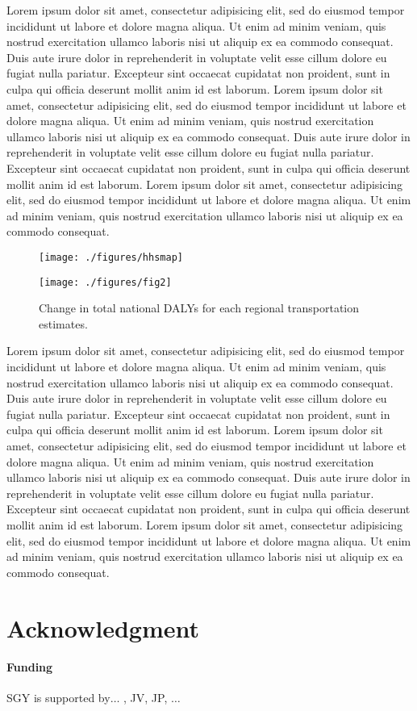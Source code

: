 \documentclass{bioinfo}
\begin{document}
Lorem ipsum dolor sit amet, consectetur adipisicing elit, sed do
eiusmod tempor incididunt ut labore et dolore magna aliqua. Ut enim ad
minim veniam, quis nostrud exercitation ullamco laboris nisi ut
aliquip ex ea commodo consequat. Duis aute irure dolor in
reprehenderit in voluptate velit esse cillum dolore eu fugiat nulla
pariatur. Excepteur sint occaecat cupidatat non proident, sunt in
culpa qui officia deserunt mollit anim id est laborum. Lorem ipsum
dolor sit amet, consectetur adipisicing elit, sed do eiusmod tempor
incididunt ut labore et dolore magna aliqua. Ut enim ad minim veniam,
quis nostrud exercitation ullamco laboris nisi ut aliquip ex ea
commodo consequat. Duis aute irure dolor in reprehenderit in voluptate
velit esse cillum dolore eu fugiat nulla pariatur. Excepteur sint
occaecat cupidatat non proident, sunt in culpa qui officia deserunt
mollit anim id est laborum. Lorem ipsum dolor sit amet, consectetur
adipisicing elit, sed do eiusmod tempor incididunt ut labore et dolore
magna aliqua. Ut enim ad minim veniam, quis nostrud exercitation
ullamco laboris nisi ut aliquip ex ea commodo consequat.

\begin{figure}[t]
    \centerline{\texttt{[image: ./figures/hhsmap]}}
    \centerline{\texttt{[image: ./figures/fig2]}}
    \caption{Change in total national DALYs for each regional
      transportation estimates.}\label{dalyFigure}
\end{figure}

Lorem ipsum dolor sit amet, consectetur adipisicing elit, sed do
eiusmod tempor incididunt ut labore et dolore magna aliqua. Ut enim ad
minim veniam, quis nostrud exercitation ullamco laboris nisi ut
aliquip ex ea commodo consequat. Duis aute irure dolor in
reprehenderit in voluptate velit esse cillum dolore eu fugiat nulla
pariatur. Excepteur sint occaecat cupidatat non proident, sunt in
culpa qui officia deserunt mollit anim id est laborum. Lorem ipsum
dolor sit amet, consectetur adipisicing elit, sed do eiusmod tempor
incididunt ut labore et dolore magna aliqua. Ut enim ad minim veniam,
quis nostrud exercitation ullamco laboris nisi ut aliquip ex ea
commodo consequat. Duis aute irure dolor in reprehenderit in voluptate
velit esse cillum dolore eu fugiat nulla pariatur. Excepteur sint
occaecat cupidatat non proident, sunt in culpa qui officia deserunt
mollit anim id est laborum. Lorem ipsum dolor sit amet, consectetur
adipisicing elit, sed do eiusmod tempor incididunt ut labore et dolore
magna aliqua. Ut enim ad minim veniam, quis nostrud exercitation
ullamco laboris nisi ut aliquip ex ea commodo consequat.

\section*{Acknowledgment}
\paragraph{Funding\textcolon} SGY is supported by$\ldots$ , JV, JP, $\ldots$


%
%

\end{document}
